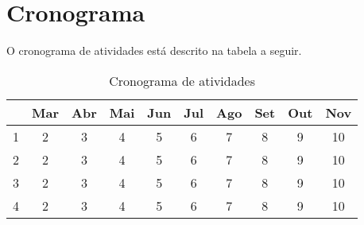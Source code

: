 \chapter{Cronograma}
\label{cap:cronograma}

O cronograma de atividades está descrito na tabela a seguir.

\begin{table}[h!]
    \centering
    \begin{tabular}{|c c c c c c c c c c|}
     \hline
       & Mar & Abr & Mai & Jun & Jul & Ago & Set & Out & Nov \\
     \hline\hline
     1 & 2 & 3 & 4 & 5 & 6 & 7 & 8 & 9 & 10\\
     2 & 2 & 3 & 4 & 5 & 6 & 7 & 8 & 9 & 10\\
     3 & 2 & 3 & 4 & 5 & 6 & 7 & 8 & 9 & 10\\
     4 & 2 & 3 & 4 & 5 & 6 & 7 & 8 & 9 & 10\\
     \hline
    \end{tabular}
    \caption{Cronograma de atividades}
    \label{cronograma-atividades}
\end{table}
